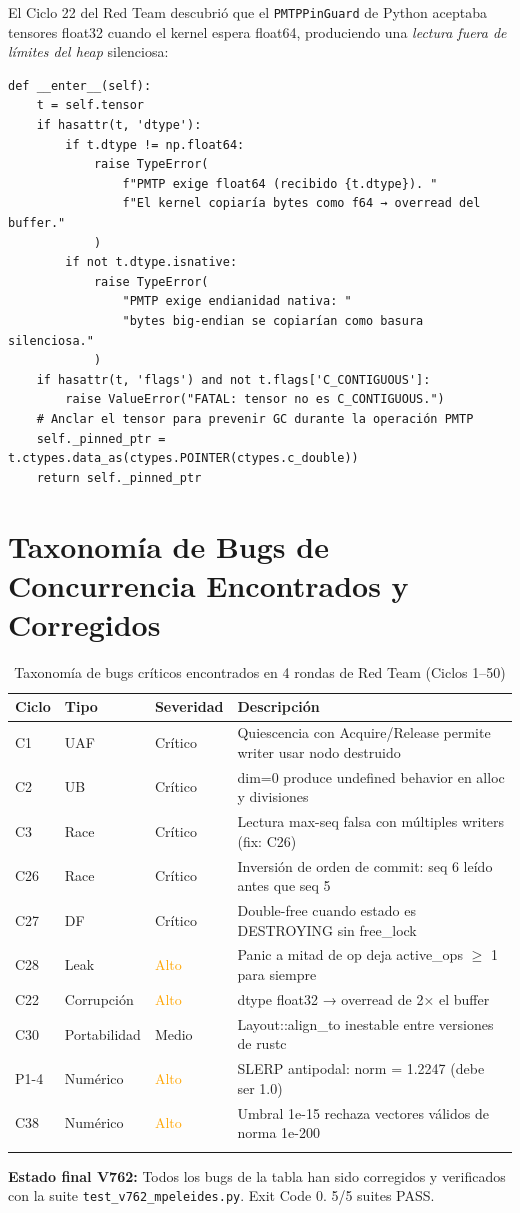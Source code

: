 El Ciclo 22 del Red Team descubrió que el \texttt{PMTPPinGuard} de Python aceptaba
tensores float32 cuando el kernel espera float64, produciendo una \textit{lectura
fuera de límites del heap} silenciosa:

\begin{lstlisting}[style=pythonstyle, caption={PMTPPinGuard con validación de dtype (Ciclo 22)}, label=lst:pinpin_guard]
def __enter__(self):
    t = self.tensor
    if hasattr(t, 'dtype'):
        if t.dtype != np.float64:
            raise TypeError(
                f"PMTP exige float64 (recibido {t.dtype}). "
                f"El kernel copiaría bytes como f64 → overread del buffer."
            )
        if not t.dtype.isnative:
            raise TypeError(
                "PMTP exige endianidad nativa: "
                "bytes big-endian se copiarían como basura silenciosa."
            )
    if hasattr(t, 'flags') and not t.flags['C_CONTIGUOUS']:
        raise ValueError("FATAL: tensor no es C_CONTIGUOUS.")
    # Anclar el tensor para prevenir GC durante la operación PMTP
    self._pinned_ptr = t.ctypes.data_as(ctypes.POINTER(ctypes.c_double))
    return self._pinned_ptr
\end{lstlisting}

\section{Taxonomía de Bugs de Concurrencia Encontrados y Corregidos}

\begin{longtable}{lllp{5cm}}
\toprule
\textbf{Ciclo} & \textbf{Tipo} & \textbf{Severidad} & \textbf{Descripción} \\
\midrule
C1 & UAF & \textcolor{polydimred}{Crítico} & Quiescencia con Acquire/Release permite writer usar nodo destruido \\
C2 & UB & \textcolor{polydimred}{Crítico} & dim=0 produce undefined behavior en alloc y divisiones \\
C3 & Race & \textcolor{polydimred}{Crítico} & Lectura max-seq falsa con múltiples writers (fix: C26) \\
C26 & Race & \textcolor{polydimred}{Crítico} & Inversión de orden de commit: seq 6 leído antes que seq 5 \\
C27 & DF & \textcolor{polydimred}{Crítico} & Double-free cuando estado es DESTROYING sin free\_lock \\
C28 & Leak & \textcolor{orange}{Alto} & Panic a mitad de op deja active\_ops $\ge$ 1 para siempre \\
C22 & Corrupción & \textcolor{orange}{Alto} & dtype float32 → overread de 2× el buffer \\
C30 & Portabilidad & \textcolor{polydimgold}{Medio} & Layout::align\_to inestable entre versiones de rustc \\
P1-4 & Numérico & \textcolor{orange}{Alto} & SLERP antipodal: norm = 1.2247 (debe ser 1.0) \\
C38 & Numérico & \textcolor{orange}{Alto} & Umbral 1e-15 rechaza vectores válidos de norma 1e-200 \\
\bottomrule
\caption{Taxonomía de bugs críticos encontrados en 4 rondas de Red Team (Ciclos 1--50)}
\label{tab:bugs}
\end{longtable}

\begin{certifiedbox}
\textbf{Estado final V762:} Todos los bugs de la tabla han sido corregidos y verificados
con la suite \texttt{test\_v762\_mpeleides.py}. Exit Code 0. 5/5 suites PASS.
\end{certifiedbox}
